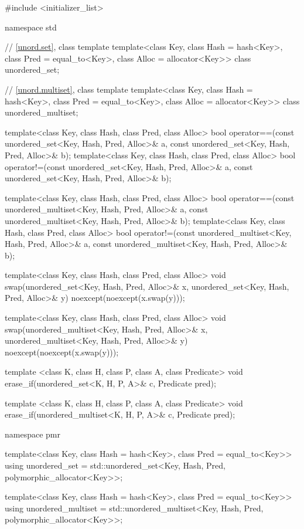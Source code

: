 \begin{codeblock}
#include <initializer_list>

namespace std {
  // \ref{unord.set}, class template 
  template<class Key,
           class Hash = hash<Key>,
           class Pred = equal_to<Key>,
           class Alloc = allocator<Key>>
    class unordered_set;

  // \ref{unord.multiset}, class template 
  template<class Key,
           class Hash = hash<Key>,
           class Pred = equal_to<Key>,
           class Alloc = allocator<Key>>
    class unordered_multiset;

  template<class Key, class Hash, class Pred, class Alloc>
    bool operator==(const unordered_set<Key, Hash, Pred, Alloc>& a,
                    const unordered_set<Key, Hash, Pred, Alloc>& b);
  template<class Key, class Hash, class Pred, class Alloc>
    bool operator!=(const unordered_set<Key, Hash, Pred, Alloc>& a,
                    const unordered_set<Key, Hash, Pred, Alloc>& b);

  template<class Key, class Hash, class Pred, class Alloc>
    bool operator==(const unordered_multiset<Key, Hash, Pred, Alloc>& a,
                    const unordered_multiset<Key, Hash, Pred, Alloc>& b);
  template<class Key, class Hash, class Pred, class Alloc>
    bool operator!=(const unordered_multiset<Key, Hash, Pred, Alloc>& a,
                    const unordered_multiset<Key, Hash, Pred, Alloc>& b);

  template<class Key, class Hash, class Pred, class Alloc>
    void swap(unordered_set<Key, Hash, Pred, Alloc>& x,
              unordered_set<Key, Hash, Pred, Alloc>& y)
      noexcept(noexcept(x.swap(y)));

  template<class Key, class Hash, class Pred, class Alloc>
    void swap(unordered_multiset<Key, Hash, Pred, Alloc>& x,
              unordered_multiset<Key, Hash, Pred, Alloc>& y)
      noexcept(noexcept(x.swap(y)));

  template <class K, class H, class P, class A, class Predicate>
    void erase_if(unordered_set<K, H, P, A>& c, Predicate pred);

  template <class K, class H, class P, class A, class Predicate>
    void erase_if(unordered_multiset<K, H, P, A>& c, Predicate pred);

  namespace pmr {
    template<class Key,
             class Hash = hash<Key>,
             class Pred = equal_to<Key>>
      using unordered_set = std::unordered_set<Key, Hash, Pred,
                                               polymorphic_allocator<Key>>;

    template<class Key,
             class Hash = hash<Key>,
             class Pred = equal_to<Key>>
      using unordered_multiset = std::unordered_multiset<Key, Hash, Pred,
                                                         polymorphic_allocator<Key>>;
  }
}
\end{codeblock}


